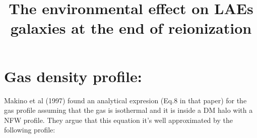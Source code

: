 \documentclass[12pt]{article}
\title{\begin{LARGE}
{The environmental effect on LAEs galaxies at the end of reionization}
\end{LARGE}}
\begin{document}
\maketitle




\section{Gas density profile:}\label{sec:rho}

Makino et al (1997) found an analytical expresion (Eq.8 in that paper) for the gas profile assuming that the gas
is isothermal and it is inside a DM halo with a NFW profile. They argue that this equation it's well approximated by 
the following profile:
\end{document}
